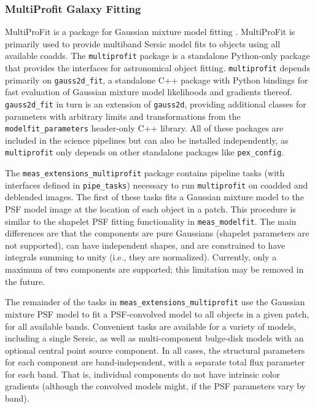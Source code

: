 \subsubsection{MultiProfit Galaxy Fitting}
\label{sec:multiprofit}

MultiProFit is a package for Gaussian mixture model fitting \citep{DMTN-312}.
MultiProFit is primarily used to provide multiband Sersic model fits to objects using all available coadds.
The \texttt{multiprofit} package is a standalone Python-only package that provides the interfaces for astronomical object fitting.
\texttt{multiprofit} depends primarily on \texttt{gauss2d\_fit}, a standalone C++ package with Python bindings for fast evaluation of Gaussian mixture model likelihoods and gradients thereof.
\texttt{gauss2d\_fit} in turn is an extension of \texttt{gauss2d}, providing additional classes for parameters with arbitrary limits and transformations from the \texttt{modelfit\_parameters} header-only C++ library.
All of these packages are included in the science pipelines but can also be installed independently, as \texttt{multiprofit} only depends on other standalone packages like \texttt{pex\_config}.

The \texttt{meas\_extensions\_multiprofit} package contains pipeline tasks (with interfaces defined in \texttt{pipe\_tasks}) necessary to run \texttt{multiprofit} on coadded and deblended images.
The first of these tasks fits a Gaussian mixture model to the PSF model image at the location of each object in a patch.
This procedure is similar to the shapelet PSF fitting functionality in \texttt{meas\_modelfit}.
The main differences are that the components are pure Gaussians (shapelet parameters are not supported), can have independent shapes, and are constrained to have integrals summing to unity (i.e., they are normalized).
Currently, only a maximum of two components are supported; this limitation may be removed in the future.

The remainder of the tasks in \texttt{meas\_extensions\_multiprofit} use the Gaussian mixture PSF model to fit a PSF-convolved model to all objects in a given patch, for all available bands.
Convenient tasks are available for a variety of models, including a single Sersic, as well as multi-component bulge-disk models with an optional central point source component.
In all cases, the structural parameters for each component are band-independent, with a separate total flux parameter for each band.
That is, individual components do not have intrinsic color gradients (although the convolved models might, if the PSF parameters vary by band).
